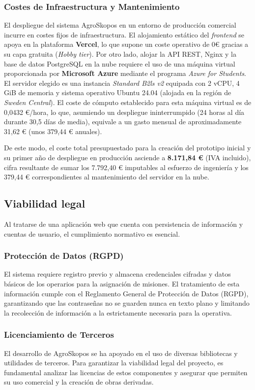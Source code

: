 \subsubsection*{Costes de Infraestructura y Mantenimiento}
El despliegue del sistema AgroSkopos en un entorno de producción comercial incurre en costes fijos de infraestructura. El alojamiento estático del \textit{frontend} se apoya en la plataforma \textbf{Vercel}, lo que supone un coste operativo de 0€ gracias a su capa gratuita (\textit{Hobby tier}). Por otro lado, alojar la API REST, Nginx y la base de datos PostgreSQL en la nube requiere el uso de una máquina virtual proporcionada por \textbf{Microsoft Azure} mediante el programa \textit{Azure for Students}. El servidor elegido es una instancia \textit{Standard B2ls v2} equipada con 2 vCPU, 4 GiB de memoria y sistema operativo Ubuntu 24.04 (alojada en la región de \textit{Sweden Central}). El coste de cómputo establecido para esta máquina virtual es de 0,0432 €/hora, lo que, asumiendo un despliegue ininterrumpido (24 horas al día durante 30,5 días de media), equivale a un gasto mensual de aproximadamente 31,62 € (unos 379,44 € anuales).

De este modo, el coste total presupuestado para la creación del prototipo inicial y su primer año de despliegue en producción asciende a \textbf{8.171,84 €} (IVA incluido), cifra resultante de sumar los 7.792,40 € imputables al esfuerzo de ingeniería y los 379,44 € correspondientes al mantenimiento del servidor en la nube.

\subsection{Viabilidad legal}
Al tratarse de una aplicación web que cuenta con persistencia de información y cuentas de usuario, el cumplimiento normativo es esencial.

\subsubsection*{Protección de Datos (RGPD)}
El sistema requiere registro previo y almacena credenciales cifradas y datos básicos de los operarios para la asignación de misiones. El tratamiento de esta información cumple con el Reglamento General de Protección de Datos (RGPD), garantizando que las contraseñas no se guarden nunca en texto plano y limitando la recolección de información a la estrictamente necesaria para la operativa.

\subsubsection*{Licenciamiento de Terceros}
El desarrollo de AgroSkopos se ha apoyado en el uso de diversas bibliotecas y utilidades de terceros. Para garantizar la viabilidad legal del proyecto, es fundamental analizar las licencias de estos componentes y asegurar que permiten su uso comercial y la creación de obras derivadas. 

